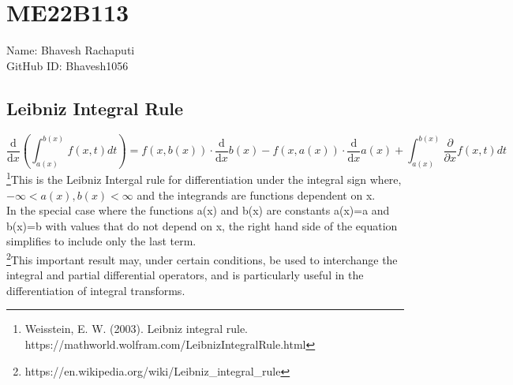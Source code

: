 \section*{ME22B113}
Name: Bhavesh Rachaputi \\
GitHub ID: Bhavesh1056 \\
\subsection*{\textbf{Leibniz Integral Rule}}
\begin{equation}
\frac{\mathrm{d} }{\mathrm{d} x}\left ( \int_{a(x)}^{b(x)}f(x,t) dt \right) = f(x,b(x)) \cdot \frac{\mathrm{d} }{\mathrm{d} x} b(x) - f(x,a(x)) \cdot \frac{\mathrm{d} }{\mathrm{d} x} a(x) + \int_{a(x)}^{b(x)} \frac{\partial}{\partial x} f(x,t) dt
\end{equation}
\footnote{Weisstein, E. W. (2003). Leibniz integral rule.
https://mathworld.wolfram.com/LeibnizIntegralRule.html}This is the Leibniz Intergal rule for differentiation under the integral sign where, $-\infty < a(x),b(x) < \infty$ and the integrands are functions dependent on x.\\ In the special case where the functions a(x) and b(x) are constants a(x)=a and b(x)=b with values that do not depend on x, the right hand side of the equation simplifies to include only the last term.\\ \footnote{https://en.wikipedia.org/wiki/Leibniz\_integral\_rule}This important result may, under certain conditions, be used to interchange the integral and partial differential operators, and is particularly useful in the differentiation of integral transforms.
